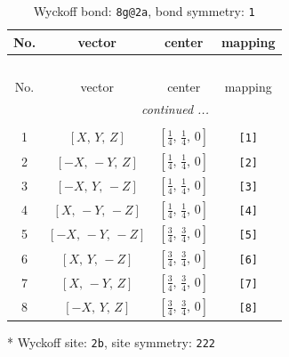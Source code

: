\documentclass[fleqn,8pt]{jsarticle}
\begin{document}
\renewcommand{\arraystretch}{1.2}
\begin{longtable}{cccc}
\caption{Wyckoff bond: {\tt 8g@2a}, bond symmetry: {\tt 1}}
 \\
 \hline \hline
No. & vector & center & mapping \\ \hline \endfirsthead

\multicolumn{3}{l}{\tablename\ \thetable{}} \\
 \hline \hline
No. & vector & center & mapping \\ \hline \endhead

 \hline \hline
\multicolumn{3}{r}{\footnotesize\it continued ...} \\ \endfoot

 \hline \hline
\multicolumn{3}{r}{} \\ \endlastfoot

1 & $\left[ X,\, Y,\, Z \right]$ & $\left[ \frac{1}{4},\, \frac{1}{4},\, 0 \right]$ & {\tt [1]} \\ \hline
2 & $\left[ - X,\, - Y,\, Z \right]$ & $\left[ \frac{1}{4},\, \frac{1}{4},\, 0 \right]$ & {\tt [2]} \\ \hline
3 & $\left[ - X,\, Y,\, - Z \right]$ & $\left[ \frac{1}{4},\, \frac{1}{4},\, 0 \right]$ & {\tt [3]} \\ \hline
4 & $\left[ X,\, - Y,\, - Z \right]$ & $\left[ \frac{1}{4},\, \frac{1}{4},\, 0 \right]$ & {\tt [4]} \\ \hline
5 & $\left[ - X,\, - Y,\, - Z \right]$ & $\left[ \frac{3}{4},\, \frac{3}{4},\, 0 \right]$ & {\tt [5]} \\ \hline
6 & $\left[ X,\, Y,\, - Z \right]$ & $\left[ \frac{3}{4},\, \frac{3}{4},\, 0 \right]$ & {\tt [6]} \\ \hline
7 & $\left[ X,\, - Y,\, Z \right]$ & $\left[ \frac{3}{4},\, \frac{3}{4},\, 0 \right]$ & {\tt [7]} \\ \hline
8 & $\left[ - X,\, Y,\, Z \right]$ & $\left[ \frac{3}{4},\, \frac{3}{4},\, 0 \right]$ & {\tt [8]} \\
\end{longtable}
* Wyckoff site: {\tt 2b}, site symmetry: {\tt 222}
\renewcommand{\arraystretch}{1.2}
\end{document}
